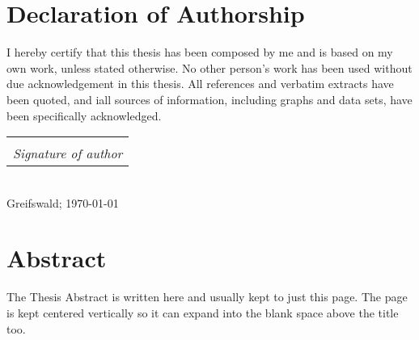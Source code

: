 \documentclass[
	10pt,
	twoside,
	chapterinoneline,
	onehalfspacing, %
	nolistspacing, %
	parskip, %
	headsepline, %
	english,
]{MastersDoctoralThesis} %
\makeatletter
\newcommand{\sign}[1]{%
  \begin{tabular}[t]{@{}c@{}}
  \makebox[1.5in]{\dotfill}\\
  \strut\emph{#1}\strut%
  \end{tabular}%
}
\makeatother
\begin{document}
	\chapter*{Declaration of Authorship}
		I hereby certify that this thesis has been composed by me and is based on 
		my own work, unless stated otherwise.	No other person’s work has been used
		without due acknowledgement in this thesis.
		All references and verbatim extracts have been quoted, and iall sources of
		information, including graphs and data sets, have been specifically
		acknowledged.\\[2.0cm]
		\begin{flushright}
			\sign{Signature of author}\\
			Greifswald; \today
		\end{flushright}
%
%
	\tableofcontents %
%

%
%
\mainmatter%
\pagestyle{thesis} %
%
	\chapter{Abstract}
    The Thesis Abstract is written here and usually kept to just this page.
    The page is kept centered vertically so it can expand into the blank space above 
    the title too.
%




% 
%	
	\appendix %
	
%
	\printbibliography[heading=bibintoc]
%
\end{document}
